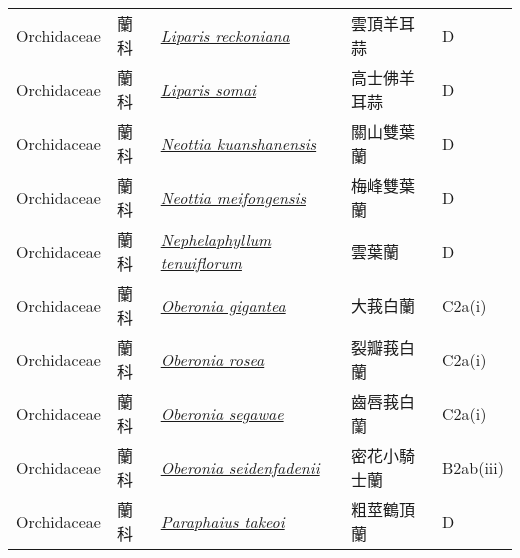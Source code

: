 {\begin{longtable}{p{2.5cm}p{2.5cm}p{4.5cm}p{2.5cm}p{3cm}}
    Orchidaceae & 蘭科 & \href{http://www.theplantlist.org/tpl1.1/search?q=Liparis+reckoniana}{\textit{Liparis reckoniana} } & 雲頂羊耳蒜 & D \index{Liparis@\textit{Liparis}!reckoniana@\textit{reckoniana}}  \index{雲頂羊耳蒜} \\
    Orchidaceae & 蘭科 & \href{http://www.theplantlist.org/tpl1.1/search?q=Liparis+somai}{\textit{Liparis somai} } & 高士佛羊耳蒜 & D \index{Liparis@\textit{Liparis}!somai@\textit{somai}}  \index{高士佛羊耳蒜} \\
    Orchidaceae & 蘭科 & \href{http://www.theplantlist.org/tpl1.1/search?q=Neottia+kuanshanensis}{\textit{Neottia kuanshanensis} } & 關山雙葉蘭 & D \index{Neottia@\textit{Neottia}!kuanshanensis@\textit{kuanshanensis}}  \index{關山雙葉蘭} \\
    Orchidaceae & 蘭科 & \href{http://www.theplantlist.org/tpl1.1/search?q=Neottia+meifongensis}{\textit{Neottia meifongensis} } & 梅峰雙葉蘭 & D \index{Neottia@\textit{Neottia}!meifongensis@\textit{meifongensis}}  \index{梅峰雙葉蘭} \\
    Orchidaceae & 蘭科 & \href{http://www.theplantlist.org/tpl1.1/search?q=Nephelaphyllum+tenuiflorum}{\textit{Nephelaphyllum tenuiflorum} } & 雲葉蘭 & D \index{Nephelaphyllum@\textit{Nephelaphyllum}!tenuiflorum@\textit{tenuiflorum}}  \index{雲葉蘭} \\
    Orchidaceae & 蘭科 & \href{http://www.theplantlist.org/tpl1.1/search?q=Oberonia+gigantea}{\textit{Oberonia gigantea} } & 大莪白蘭 & C2a(i) \index{Oberonia@\textit{Oberonia}!gigantea@\textit{gigantea}}  \index{大莪白蘭} \\
    Orchidaceae & 蘭科 & \href{http://www.theplantlist.org/tpl1.1/search?q=Oberonia+rosea}{\textit{Oberonia rosea} } & 裂瓣莪白蘭 & C2a(i) \index{Oberonia@\textit{Oberonia}!rosea@\textit{rosea}}  \index{裂瓣莪白蘭} \\
    Orchidaceae & 蘭科 & \href{http://www.theplantlist.org/tpl1.1/search?q=Oberonia+segawae}{\textit{Oberonia segawae} } & 齒唇莪白蘭 & C2a(i) \index{Oberonia@\textit{Oberonia}!segawae@\textit{segawae}}  \index{齒唇莪白蘭} \\
    Orchidaceae & 蘭科 & \href{http://www.theplantlist.org/tpl1.1/search?q=Oberonia+seidenfadenii}{\textit{Oberonia seidenfadenii} } & 密花小騎士蘭 & B2ab(iii) \index{Oberonia@\textit{Oberonia}!seidenfadenii@\textit{seidenfadenii}}  \index{密花小騎士蘭} \\
    Orchidaceae & 蘭科 & \href{http://www.theplantlist.org/tpl1.1/search?q=Paraphaius+takeoi}{\textit{Paraphaius takeoi} } & 粗莖鶴頂蘭 & D \index{Paraphaius@\textit{Paraphaius}!takeoi@\textit{takeoi}}  \index{粗莖鶴頂蘭} \\

\end{longtable}}

